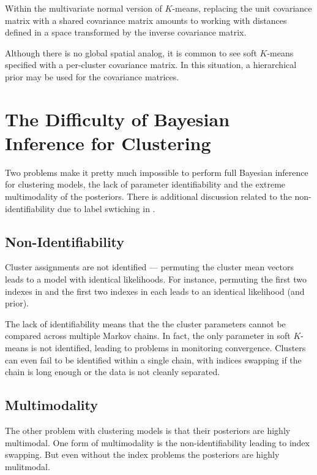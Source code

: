 Within the multivariate normal version of $K$-means, replacing the
unit covariance matrix with a shared covariance matrix amounts to
working with distances defined in a space transformed by the inverse
covariance matrix.

Although there is no global spatial analog, it is common to see soft
$K$-means specified with a per-cluster covariance matrix. In this
situation, a hierarchical prior may be used for the covariance matrices.



\section{The Difficulty of Bayesian Inference for Clustering}

Two problems make it pretty much impossible to perform full Bayesian
inference for clustering models, the lack of parameter identifiability
and the extreme multimodality of the posteriors.  There is additional
discussion related to the non-identifiability due to label swtiching
in .

\subsection{Non-Identifiability}

Cluster assignments are not identified --- permuting the cluster mean
vectors  leads to a model with identical likelihoods.  For
instance, permuting the first two indexes in  and the first
two indexes in each  leads to an identical likelihood
(and prior).

The lack of identifiability means that the the cluster parameters
cannot be compared across multiple Markov chains.  In fact, the only
parameter in soft $K$-means is not identified, leading to problems in
monitoring convergence.  Clusters can even fail to be identified
within a single chain, with indices swapping if the chain is long
enough or the data is not cleanly separated. 

\subsection{Multimodality}

The other problem with clustering models is that their posteriors are
highly multimodal.  One form of multimodality is the
non-identifiability leading to index swapping.  But even without
the index problems the posteriors are highly mulitmodal.

